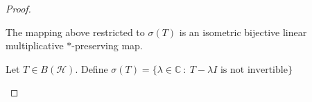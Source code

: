\begin{proof}
  \begin{corollary}
    The mapping above restricted to $\sigma(T)$ is an isometric
    bijective linear multiplicative $*$-preserving map.
  \end{corollary}

  \begin{definition}
    Let $T \in B(\mathcal{H})$. Define $\sigma(T) = \{ \lambda \in
    \mathbb{C}  \ : \   T - \lambda I \textrm{ is not invertible} \}$
  \end{definition}
\end{proof}

